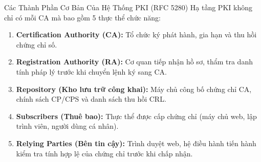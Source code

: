 \begin{frame}{Các Thành Phần Cơ Bản Của Hệ Thống PKI (RFC 5280)}
  Hạ tầng PKI không chỉ có mỗi CA mà bao gồm 5 thực thể chức năng:
  \begin{enumerate}\small
    \item \textbf{Certification Authority (CA):} Tổ chức ký phát hành, gia hạn và thu hồi chứng chỉ số.
    \item \textbf{Registration Authority (RA):} Cơ quan tiếp nhận hồ sơ, thẩm tra danh tính pháp lý trước khi chuyển lệnh ký sang CA.
    \item \textbf{Repository (Kho lưu trữ công khai):} Máy chủ công bố chứng chỉ CA, chính sách CP/CPS và danh sách thu hồi CRL.
    \item \textbf{Subscribers (Thuê bao):} Thực thể được cấp chứng chỉ (máy chủ web, lập trình viên, người dùng cá nhân).
    \item \textbf{Relying Parties (Bên tin cậy):} Trình duyệt web, hệ điều hành tiến hành kiểm tra tính hợp lệ của chứng chỉ trước khi chấp nhận.
  \end{enumerate}
\end{frame}

